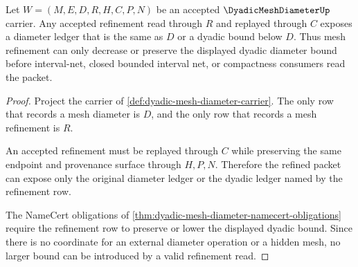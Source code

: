 \begin{theorem}
\label{thm:dyadic-mesh-diameter-refinement-monotonicity}
Let $W=(M,E,D,R,H,C,P,N)$ be an accepted $\DyadicMeshDiameterUp$ carrier. Any accepted refinement read through $R$ and replayed through $C$ exposes a diameter ledger that is the same as $D$ or a dyadic bound below $D$. Thus mesh refinement can only decrease or preserve the displayed dyadic diameter bound before interval-net, closed bounded interval net, or compactness consumers read the packet.
\end{theorem}
\begin{proof}
Project the carrier of \autoref{def:dyadic-mesh-diameter-carrier}. The only row that records a mesh diameter is $D$, and the only row that records a mesh refinement is $R$.

An accepted refinement must be replayed through $C$ while preserving the same endpoint and provenance surface through $H,P,N$. Therefore the refined packet can expose only the original diameter ledger or the dyadic ledger named by the refinement row.

The NameCert obligations of \autoref{thm:dyadic-mesh-diameter-namecert-obligations} require the refinement row to preserve or lower the displayed dyadic bound. Since there is no coordinate for an external diameter operation or a hidden mesh, no larger bound can be introduced by a valid refinement read.
\end{proof}


\begin{closurestatus}{\DyadicMeshDiameterUp}
  \theoryclosure{\seedClosure}
  \formalstatus{\encodedDefV}
\end{closurestatus}

